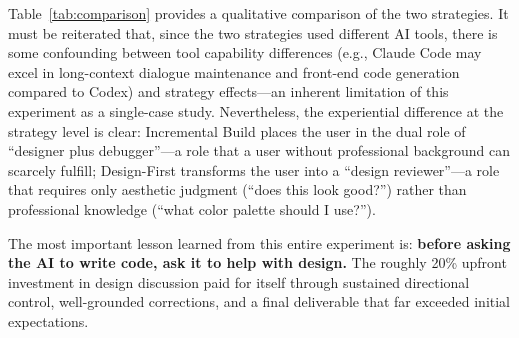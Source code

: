 \begin{table}[t]
\centering
\caption{Qualitative comparison of the two Vibe Coding strategies.}
\label{tab:comparison}
\end{table}

Table~\ref{tab:comparison} provides a qualitative comparison of the two strategies. It must be reiterated that, since the two strategies used different AI tools, there is some confounding between tool capability differences (e.g., Claude Code may excel in long-context dialogue maintenance and front-end code generation compared to Codex) and strategy effects---an inherent limitation of this experiment as a single-case study. Nevertheless, the experiential difference at the strategy level is clear: Incremental Build places the user in the dual role of ``designer plus debugger''---a role that a user without professional background can scarcely fulfill; Design-First transforms the user into a ``design reviewer''---a role that requires only aesthetic judgment (``does this look good?'') rather than professional knowledge (``what color palette should I use?'').

The most important lesson learned from this entire experiment is: \textbf{before asking the AI to write code, ask it to help with design.} The roughly 20\% upfront investment in design discussion paid for itself through sustained directional control, well-grounded corrections, and a final deliverable that far exceeded initial expectations.

